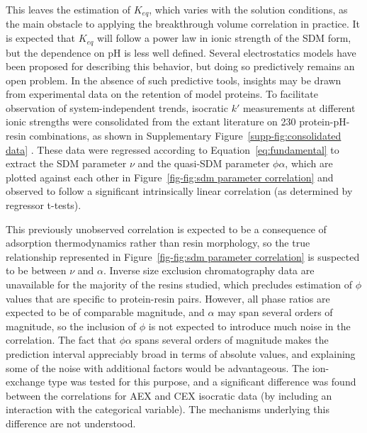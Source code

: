 \documentclass[preprint,review,12pt]{elsarticle}
\begin{document}
        This leaves the estimation of $K_{eq}$, which varies with the solution conditions, as the main obstacle to applying the breakthrough volume correlation in practice. It is expected that $K_{eq}$ will follow a power law in ionic strength of the SDM form, but the dependence on pH is less well defined. Several electrostatics models have been proposed for describing this behavior, but doing so predictively remains an open problem. In the absence of such predictive tools, insights may be drawn from experimental data on the retention of model proteins. To facilitate observation of system-independent trends, isocratic $k'$ measurements at different ionic strengths were consolidated from the extant literature on 230 protein-pH-resin combinations, as shown in Supplementary Figure~\ref{supp-fig:consolidated data} \cite{Staby2000, Staby2001, Staby2004, Staby2005, Staby2006, Staby2007, DePhillips2001, DePhillips2004, Kumar2015, bai1999}. These data were regressed according to Equation~\ref{eq:fundamental} to extract the SDM parameter $\nu$ and the quasi-SDM parameter $\phi \alpha$, which are plotted against each other in Figure~\ref{fig-fig:sdm parameter correlation} and observed to follow a significant intrinsically linear correlation (as determined by regressor t-tests).


        This previously unobserved correlation is expected to be a consequence of adsorption thermodynamics rather than resin morphology, so the true relationship represented in Figure~\ref{fig-fig:sdm parameter correlation} is suspected to be between $\nu$ and $\alpha$. Inverse size exclusion chromatography data are unavailable for the majority of the resins studied, which precludes estimation of $\phi$ values that are specific to protein-resin pairs. However, all phase ratios are expected to be of comparable magnitude, and $\alpha$ may span several orders of magnitude, so the inclusion of $\phi$ is not expected to introduce much noise in the correlation. The fact that $\phi \alpha$ spans several orders of magnitude makes the prediction interval appreciably broad in terms of absolute values, and explaining some of the noise with additional factors would be advantageous. The ion-exchange type was tested for this purpose, and a significant difference was found between the correlations for AEX and CEX isocratic data (by including an interaction with the categorical variable). The mechanisms underlying this difference are not understood.
\end{document}
